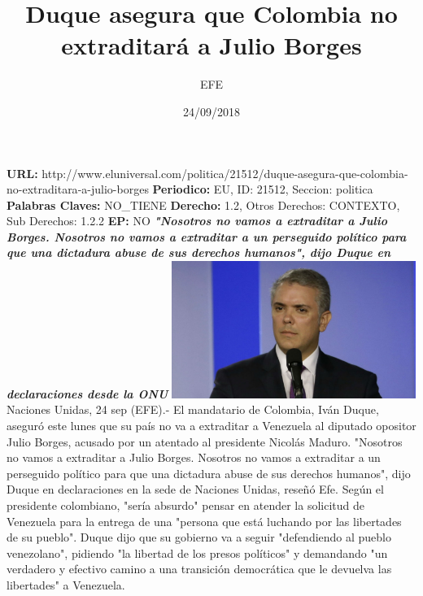 \documentclass{article}%
\title{\textbf{Duque asegura que Colombia no extraditará a Julio Borges}}%
\author{EFE}%
\date{24/09/2018}%
\begin{document}
%
\normalsize%
\maketitle%
\textbf{URL: }%
http://www.eluniversal.com/politica/21512/duque{-}asegura{-}que{-}colombia{-}no{-}extraditara{-}a{-}julio{-}borges\newline%
%
\textbf{Periodico: }%
EU, %
ID: %
21512, %
Seccion: %
politica\newline%
%
\textbf{Palabras Claves: }%
NO\_TIENE\newline%
%
\textbf{Derecho: }%
1.2, %
Otros Derechos: %
CONTEXTO, %
Sub Derechos: %
1.2.2\newline%
%
\textbf{EP: }%
NO\newline%
\newline%
%
\textbf{\textit{"Nosotros no vamos a extraditar a Julio Borges. Nosotros no vamos a extraditar a un perseguido político para que una dictadura abuse de sus derechos humanos", dijo Duque en declaraciones desde la ONU}}%
\newline%
\newline%
%
\includegraphics[width=300px]{248.jpg}%
\newline%
%
Naciones Unidas, 24 sep (EFE).{-} El mandatario de Colombia, Iván Duque, aseguró este lunes que su país no va a extraditar a Venezuela al diputado opositor Julio Borges, acusado por un atentado al presidente Nicolás Maduro.%
\newline%
%
"Nosotros no vamos a extraditar a Julio Borges. Nosotros no vamos a extraditar a un perseguido político para que una dictadura abuse de sus derechos humanos", dijo Duque en declaraciones en la sede de Naciones Unidas, reseñó Efe.%
\newline%
%
Según el presidente colombiano, "sería absurdo" pensar en atender la solicitud de Venezuela para la entrega de una "persona que está luchando por las libertades de su pueblo".%
\newline%
%
Duque dijo que su gobierno va a seguir "defendiendo al pueblo venezolano", pidiendo "la libertad de los presos políticos" y demandando "un verdadero y efectivo camino a una transición democrática que le devuelva las libertades" a Venezuela.%
\end{document}
